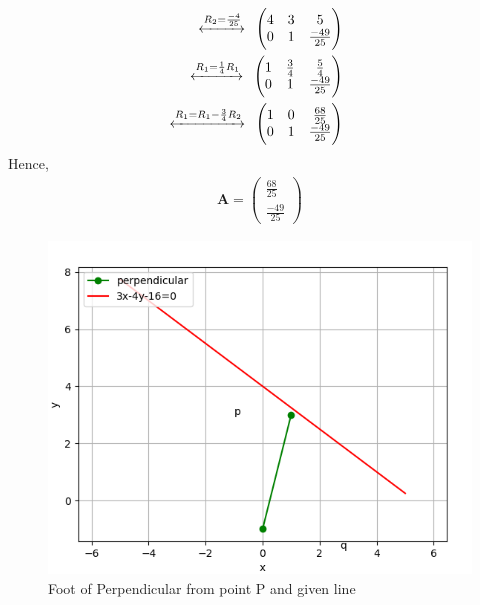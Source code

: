 \documentclass[12pt]{article}
\let\vec\mathbf
\newcommand{\myvec}[1]{\ensuremath{\begin{pmatrix}#1\end{pmatrix}}}
\let\vec\mathbf
\begin{document}
\begin{enumerate}
\begin{align}
\begin{array}{cc|c}
  \end{array}
\\
  \xleftrightarrow{R_2=\frac{-4}{25}}
  \begin{array}{rr|r}
  \myvec{
  4 & 3 & 5\\
  0 & 1 & \frac{-49}{25}}
  \end{array}
\\
  \xleftrightarrow{R_1=\frac{1}{4}R_1}
  \begin{array}{rr|r}
  \myvec{
  1 & \frac{3}{4} & \frac{5}{4}\\
  0 & 1 & \frac{-49}{25}}
  \end{array}
  \\
  \xleftrightarrow{R_1=R_1-\frac{3}{4}R_2}
  \begin{array}{rr|r}
  \myvec{
  1 & 0 & \frac{68}{25}\\
  0 & 1 & \frac{-49}{25}}   
  \end{array}        
\end{align}
Hence,
\begin{align}
\vec{A}=\myvec{\frac{68}{25}\\\frac{-49}{25}}
\end{align}
\begin{figure}[!h]
	\begin{center} 
	    \includegraphics[width=\columnwidth]{figs/lines.png}
	\end{center}
\caption{Foot of Perpendicular from point P and given line}
\label{fig:Fig}
\end{figure}
\end{enumerate}
\end{document}
